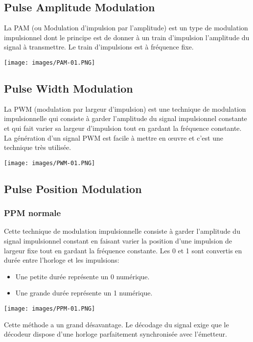 \documentclass[a4paper]{article}
\begin{document}
\subsection{Pulse Amplitude Modulation}



La PAM (ou Modulation d’impulsion par l’amplitude) est un type de modulation impulsionnel dont le principe est de donner à un train d’impulsion l’amplitude du signal à transmettre. Le train d’impulsions est à fréquence fixe.
\begin{center}
    \texttt{[image: images/PAM-01.PNG]}
\end{center}





\subsection{Pulse Width Modulation}



La PWM (modulation par largeur d’impulsion) est une technique de modulation impulsionnelle qui consiste à garder l’amplitude du signal impulsionnel constante et qui fait varier sa largeur d’impulsion tout en gardant la fréquence constante. La génération d'un signal PWM est facile à mettre en œuvre et c'est une technique très utilisée.
\begin{center}
    \texttt{[image: images/PWM-01.PNG]}
\end{center}





\subsection{Pulse Position Modulation}



\subsubsection{PPM normale}

Cette technique de modulation impulsionnelle consiste à garder l’amplitude du signal impulsionnel constant en faisant varier la position d’une impulsion de largeur fixe tout en gardant la fréquence constante. Les 0 et 1 sont convertis en durée entre l'horloge et les
impulsions:
\begin{itemize}
    \item Une petite durée représente un 0 numérique.
    \item Une grande durée représente un 1 numérique.
\end{itemize}
\begin{center}
    \texttt{[image: images/PPM-01.PNG]}
\end{center}
Cette méthode a un grand désavantage. Le décodage du signal exige que le décodeur dispose d'une horloge parfaitement synchronisée avec l'émetteur.
\end{document}
